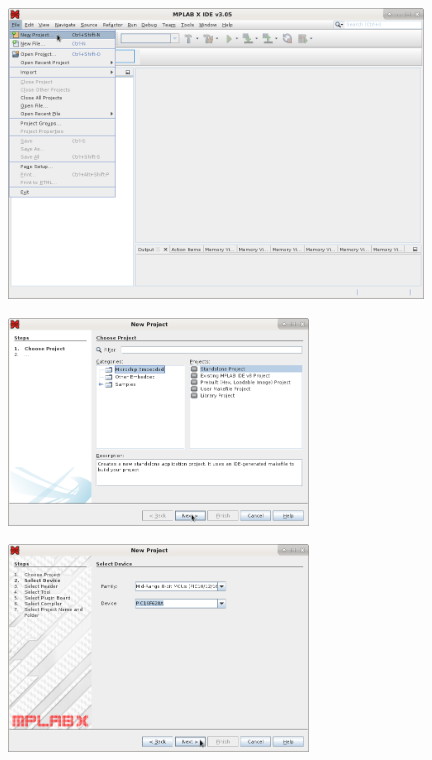 \begin{figure}[H]
\center
\includegraphics[width=0.98\textwidth]{img/hmd/mplab10.png} 
\end{figure} 

\begin{figure}[H]
\center
\includegraphics[width=0.71\textwidth]{img/hmd/mplab11.png} 
\end{figure} 

\begin{figure}[H]
\center
\includegraphics[width=0.71\textwidth]{img/hmd/mplab12.png} 
\end{figure}

